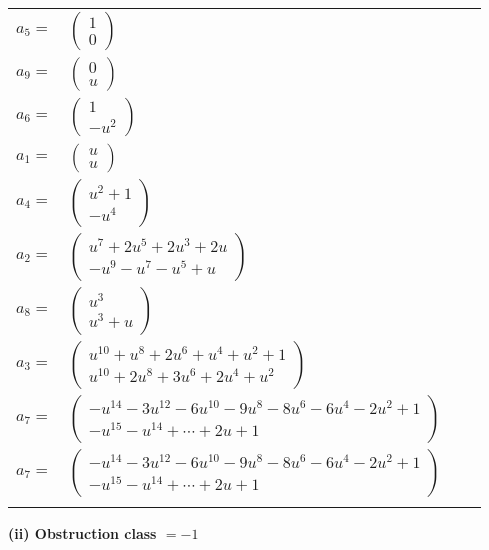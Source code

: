 \documentclass[1p]{elsarticle_modified}
\theoremstyle{definition}
\begin{document}
\begin{tabular}{m{7pt} m{180pt} m{7pt} m{180pt} }
\flushright $a_{5}=$&$\begin{pmatrix}1\\0\end{pmatrix}$ \\
\flushright $a_{9}=$&$\begin{pmatrix}0\\u\end{pmatrix}$ \\
\flushright $a_{6}=$&$\begin{pmatrix}1\\- u^2\end{pmatrix}$ \\
\flushright $a_{1}=$&$\begin{pmatrix}u\\u\end{pmatrix}$ \\
\flushright $a_{4}=$&$\begin{pmatrix}u^2+1\\- u^4\end{pmatrix}$ \\
\flushright $a_{2}=$&$\begin{pmatrix}u^7+2 u^5+2 u^3+2 u\\- u^9- u^7- u^5+u\end{pmatrix}$ \\
\flushright $a_{8}=$&$\begin{pmatrix}u^3\\u^3+u\end{pmatrix}$ \\
\flushright $a_{3}=$&$\begin{pmatrix}u^{10}+u^8+2 u^6+u^4+u^2+1\\u^{10}+2 u^8+3 u^6+2 u^4+u^2\end{pmatrix}$ \\
\flushright $a_{7}=$&$\begin{pmatrix}- u^{14}-3 u^{12}-6 u^{10}-9 u^8-8 u^6-6 u^4-2 u^2+1\\- u^{15}- u^{14}+\cdots+2 u+1\end{pmatrix}$\\ \flushright $a_{7}=$&$\begin{pmatrix}- u^{14}-3 u^{12}-6 u^{10}-9 u^8-8 u^6-6 u^4-2 u^2+1\\- u^{15}- u^{14}+\cdots+2 u+1\end{pmatrix}$\\&\end{tabular}
\flushleft \textbf{(ii) Obstruction class $= -1$}\\~\\
\end{document}
